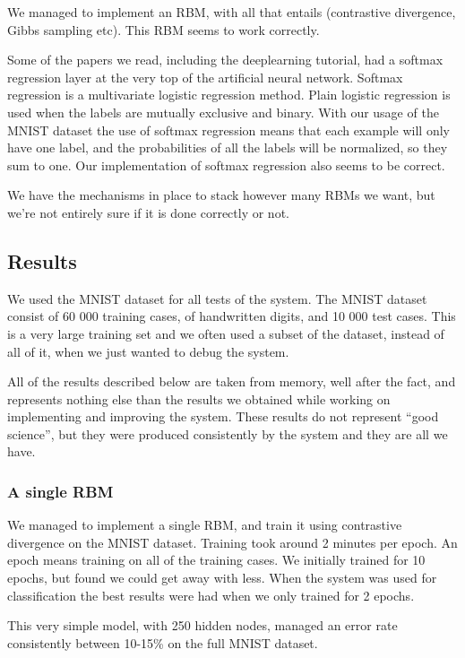 \documentclass[11pt]{article}
\begin{document}
We managed to implement an RBM, with all that entails (contrastive divergence, Gibbs sampling etc).  This RBM seems to work correctly.

Some of the papers we read, including the deeplearning tutorial, had a softmax regression layer at the very top of the artificial neural network.  Softmax regression is a multivariate logistic regression method.  Plain logistic regression is used when the labels are mutually exclusive and binary.  With our usage of the MNIST dataset the use of softmax regression means that each example will only have one label, and the probabilities of all the labels will be normalized, so they sum to one.  Our implementation of softmax regression also seems to be correct.

We have the mechanisms in place to stack however many RBMs we want, but we're not entirely sure if it is done correctly or not.

\subsection{Results}

We used the MNIST dataset for all tests of the system.  The MNIST dataset consist of 60 000 training cases, of handwritten digits, and 10 000 test cases.  This is a very large training set and we often used a subset of the dataset, instead of all of it, when we just wanted to debug the system.

All of the results described below are taken from memory, well after the fact, and represents nothing else than the results we obtained while working on implementing and improving the system.  These results do not represent ``good science'', but they were produced consistently by the system and they are all we have.

\subsubsection{A single RBM}

We managed to implement a single RBM, and train it using contrastive divergence on the MNIST dataset.  Training took around 2 minutes per epoch.  An epoch means training on all of the training cases. We initially trained for 10 epochs, but found we could get away with less. When the system was used for classification the best results were had when we only trained for 2 epochs.

This very simple model, with 250 hidden nodes, managed an error rate consistently between 10-15\% on the full MNIST dataset.
\end{document}
